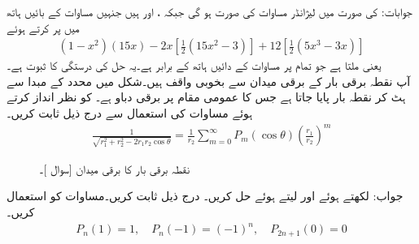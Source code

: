 جوابات: کی صورت میں لیژانڈر مساوات  کی صورت  ہو گی جبکہ
 ،  اور  ہیں جنہیں مساوات کے بائیں ہاتھ میں پر کرتے ہوئے
\begin{align*}
(1-x^2)(15x)-2x[\tfrac{1}{2}(15x^2-3)]+12[\tfrac{1}{2}(5x^3-3x)]
\end{align*}
 یعنی  ملتا ہے جو تمام  پر مساوات کے دائیں ہاتھ کے برابر ہے۔یہ حل کی درستگی کا ثبوت ہے۔
\quad {}\\
آپ نقطہ برقی بار کے برقی میدان سے بخوبی واقف ہیں۔شکل  میں محدد کے مبدا  سے ہٹ کر نقطہ بار  پایا جاتا ہے جس کا عمومی مقام  پر برقی دباو
  ہے۔ کو نظر انداز کرتے ہوئے مساوات  کی استعمال سے  درج ذیل ثابت کریں۔
\begin{align}
\frac{1}{\sqrt{r_1^2+r_2^2-2r_1r_2\cos \theta}}=\frac{1}{r_2}\sum_{m=0}^{\infty} P_m(\cos \theta) \left(\frac{r_1}{r_2}\right)^m
\end{align}
%
\begin{figure}
\centering
{}
\caption{نقطہ برقی بار کا برقی میدان [سوال ]۔}
\label{شکل_بیسل_نقطہ_بار_میدان}
\end{figure}
%
جواب: لکھتے ہوئے  اور  لیتے ہوئے حل کریں۔
\quad 
درج ذیل ثابت کریں۔مساوات  کو استعمال کریں۔
\begin{align*}
P_n(1)=1,\quad P_n(-1)=(-1)^n,\quad P_{2n+1}(0)=0
\end{align*}
\\
